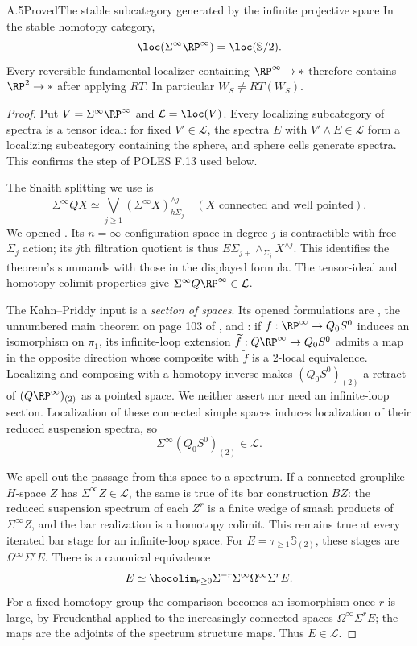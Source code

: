 \begin{claim}{A.5}{Proved}{The stable subcategory generated by the infinite projective space}\label{A5}
In the stable homotopy category,
\[
 \loc(\Sigma^\infty\RP^\infty)=\loc(\mathbb S/2).
\]
Every reversible fundamental localizer containing $\RP^\infty\to *$ therefore contains $\RP^2\to *$ after applying $RT$. In particular $W_S\ne RT(W_S)$.
\end{claim}
\begin{proof}
Put $V=\Sigma^\infty\RP^\infty$ and $\mathcal L=\loc(V)$. Every localizing subcategory of spectra is a tensor ideal: for fixed $V'\in\mathcal L$, the spectra $E$ with $V'\wedge E\in\mathcal L$ form a localizing subcategory containing the sphere, and sphere cells generate spectra. This confirms the step of POLES F.13 used below.

The Snaith splitting we use is
\[
 \Sigma^\infty QX\simeq
 \bigvee_{j\geq1}(\Sigma^\infty X)^{\wedge j}_{h\Sigma_j}
 \quad (X\text{ connected and well pointed}).
\]
We opened \citet[Theorem 1.1 and the filtration of Section 2]{Snaith1974}. Its $n=\infty$ configuration space in degree $j$ is contractible with free $\Sigma_j$ action; its $j$th filtration quotient is thus $E\Sigma_{j+}\wedge_{\Sigma_j}X^{\wedge j}$. This identifies the theorem's summands with those in the displayed formula. The tensor-ideal and homotopy-colimit properties give $\Sigma^\infty Q\RP^\infty\in\mathcal L$.

The Kahn--Priddy input is a \emph{section of spaces}. Its opened formulations are \citet[Theorem 3.1]{KahnPriddy1972}, the unnumbered main theorem on page 103 of \citet{KahnPriddy1978}, and \citet[Theorem 7.5]{Snaith2009}: if $f:\RP^\infty\to Q_0S^0$ induces an isomorphism on $\pi_1$, its infinite-loop extension $\widetilde f:Q\RP^\infty\to Q_0S^0$ admits a map in the opposite direction whose composite with $\widetilde f$ is a $2$-local equivalence. Localizing and composing with a homotopy inverse makes $(Q_0S^0)_{(2)}$ a retract of $(Q\RP^\infty)_{(2)}$ as a pointed space. We neither assert nor need an infinite-loop section. Localization of these connected simple spaces induces localization of their reduced suspension spectra, so
\[
 \Sigma^\infty(Q_0S^0)_{(2)}\in\mathcal L.
\]

We spell out the passage from this space to a spectrum. If a connected grouplike $H$-space $Z$ has $\Sigma^\infty Z\in\mathcal L$, the same is true of its bar construction $BZ$: the reduced suspension spectrum of each $Z^r$ is a finite wedge of smash products of $\Sigma^\infty Z$, and the bar realization is a homotopy colimit. This remains true at every iterated bar stage for an infinite-loop space. For $E=\tau_{\geq1}\mathbb S_{(2)}$, these stages are $\Omega^\infty\Sigma^rE$. There is a canonical equivalence
\[
 E\simeq\hocolim_{r\geq0}\Sigma^{-r}\Sigma^\infty
                       \Omega^\infty\Sigma^rE.
\]
For a fixed homotopy group the comparison becomes an isomorphism once $r$ is large, by Freudenthal applied to the increasingly connected spaces $\Omega^\infty\Sigma^rE$; the maps are the adjoints of the spectrum structure maps. Thus $E\in\mathcal L$.


\end{proof}
